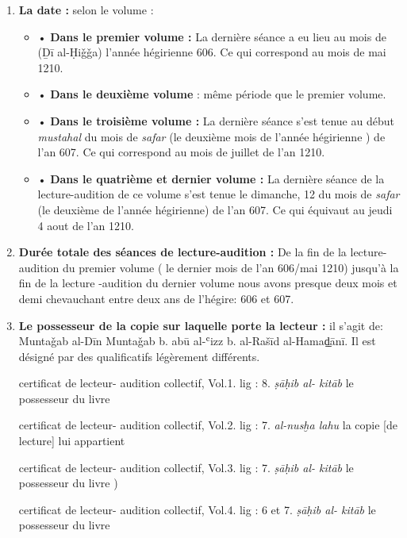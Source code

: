 \documentclass[a4paper,12pt]{report}
\begin{document}
\begin{itemize}
\begin{enumerate}
\begin{enumerate}
\item 	\textbf{La date :} selon le volume : 
\begin{itemize}
    \item •	\textbf{Dans le premier volume :} La dernière séance a eu lieu au mois de (Ḏī al-Ḥiǧǧa) l’année hégirienne   606. Ce qui correspond au mois de mai 1210.


\item•	\textbf{Dans le deuxième volume }: même période que le premier volume.

\item•	\textbf{Dans le troisième volume :} La dernière séance s'est tenue au début  \textit{mustahal}  du mois de \textit{safar} (le deuxième mois de l'année hégirienne ) de l'an   607. Ce qui correspond au mois de juillet de l’an  1210.  
\item•	\textbf{Dans le quatrième et dernier volume :} La dernière séance de la lecture-audition de ce volume s’est tenue le dimanche, 12 du mois de\textit{ safar}  (le deuxième de l’année hégirienne) de l'an 607. Ce qui équivaut au jeudi 4 aout de l’an 1210.     
\end{itemize}

\item \textbf{Durée totale des séances de lecture-audition :} 
De la fin de la lecture-audition du premier volume ( le dernier mois de l'an 606/mai 1210) jusqu'à la fin de la lecture -audition du dernier volume  nous avons presque deux mois et demi chevauchant entre deux ans de l'hégire: 606 et 607. 




\item \textbf{Le possesseur de la copie sur laquelle porte la lecteur : } il s'agit de:  
Muntaǧab al-Dīn  Muntaǧab b. ab\=u al-ʿizz b. al-Rašīd al-Hamaḏ̠ānī.
Il est désigné par des qualificatifs légèrement différents. 

 certificat de  lecteur- audition collectif,  Vol.1. lig : 8. \textit{ṣāḥib al- kitāb}  le possesseur du livre 


 certificat de  lecteur- audition collectif,  Vol.2. lig : 7. 
\textit{al-nusḫa lahu}  la copie [de lecture] lui appartient 


 certificat de  lecteur- audition collectif,  Vol.3. lig : 7. \textit{ṣāḥib al- kitāb}  le possesseur du livre )


 certificat de  lecteur- audition collectif,  Vol.4. lig : 6 et 7. \textit{ṣāḥib al- kitāb}  le possesseur du livre 




\end{enumerate}
\end{enumerate}
\end{itemize}
\end{document}
